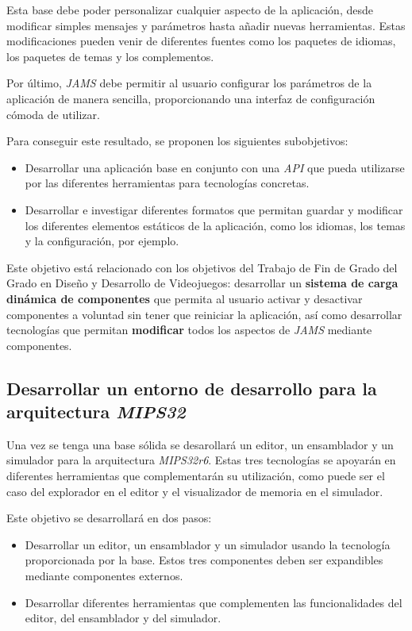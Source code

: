 Esta base debe poder personalizar cualquier aspecto de la aplicación,
desde modificar simples mensajes y parámetros hasta añadir nuevas herramientas.
Estas modificaciones pueden venir de diferentes fuentes como
los paquetes de idiomas, los paquetes de temas y los complementos.

Por último, \textit{JAMS} debe permitir al usuario configurar los parámetros
de la aplicación de manera sencilla, proporcionando una interfaz de configuración
cómoda de utilizar.

Para conseguir este resultado, se proponen los siguientes subobjetivos:
\begin{itemize}
    \item Desarrollar una aplicación base en conjunto con una \textit{API} que pueda
    utilizarse por las diferentes herramientas para tecnologías concretas.
    \item Desarrollar e investigar diferentes formatos que permitan guardar
    y modificar los diferentes elementos estáticos de la aplicación, como
    los idiomas, los temas y la configuración, por ejemplo.
\end{itemize}

Este objetivo está relacionado con los
objetivos del Trabajo de Fin de Grado del Grado en
Diseño y Desarrollo de Videojuegos: desarrollar un \textbf{sistema de carga
dinámica de componentes} que permita al usuario activar y desactivar
componentes a voluntad sin tener que reiniciar la aplicación, así como
desarrollar tecnologías que permitan \textbf{modificar}
todos los aspectos de \textit{JAMS} mediante componentes.

\subsection{Desarrollar un entorno de desarrollo para la arquitectura \textit{MIPS32}}
\label{subsec:desarrollar-un-entorno-de-desarrollo-para-la-arquitectura-mips32}

Una vez se tenga una base sólida se desarollará un editor, un ensamblador
y un simulador para la arquitectura \textit{MIPS32r6}.
Estas tres tecnologías se apoyarán en diferentes herramientas que complementarán
su utilización, como puede ser el caso del explorador en el editor y el visualizador
de memoria en el simulador.

Este objetivo se desarrollará en dos pasos:

\begin{itemize}
    \item Desarrollar un editor, un ensamblador y un simulador usando la tecnología
    proporcionada por la base.
    Estos tres componentes deben ser expandibles mediante componentes externos.
    \item Desarrollar diferentes herramientas que complementen las funcionalidades
    del editor, del ensamblador y del simulador.
\end{itemize}

